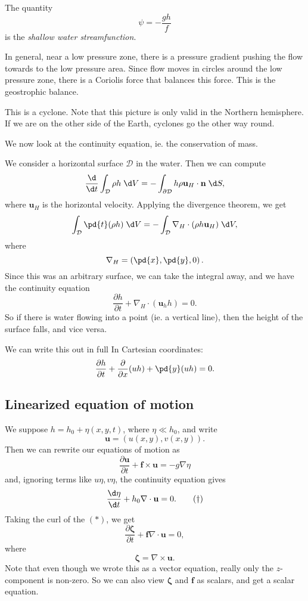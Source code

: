 \documentclass[a4paper]{article}
\begin{document}
\begin{defi}
  The quantity
  \[
    \psi = -\frac{gh}{f}
  \]
  is the \emph{shallow water streamfunction}.
\end{defi}

In general, near a low pressure zone, there is a pressure gradient pushing the flow towards to the low pressure area. Since flow moves in circles around the low pressure zone, there is a Coriolis force that balances this force. This is the geostrophic balance.
\begin{center}
\end{center}
This is a cyclone. Note that this picture is only valid in the Northern hemisphere. If we are on the other side of the Earth, cyclones go the other way round.

We now look at the continuity equation, ie. the conservation of mass.

We consider a horizontal surface $\mathcal{D}$ in the water. Then we can compute
\[
  \frac{\d}{\d t} \int_\mathcal{D} \rho h \;\d V = -\int_{\partial \mathcal{D}} h \rho \mathbf{u}_H \cdot \mathbf{n}\;\d S,
\]
where $\mathbf{u}_H$ is the horizontal velocity. Applying the divergence theorem, we get
\[
  \int_{\mathcal{D}} \pd{t} (\rho h)\;\d V = -\int_{\mathcal{D}} \nabla_H \cdot (\rho h \mathbf{u}_H)\;\d V,
\]
where
\[
  \nabla_H = \left(\pd{x}, \pd{y}, 0\right).
\]
Since this was an arbitrary surface, we can take the integral away, and we have the continuity equation
\[
  \frac{\partial h}{\partial t} + \nabla_H \cdot (\mathbf{u}_h h) = 0.
\]
So if there is water flowing into a point (ie. a vertical line), then the height of the surface falls, and vice versa.

We can write this out in full In Cartesian coordinates:
\[
  \frac{\partial h}{\partial t} + \frac{\partial}{\partial x}(uh) + \pd{y}(uh) = 0.
\]
\subsection{Linearized equation of motion}
We suppose $h = h_0 + \eta(x, y, t)$, where $\eta \ll h_0$, and write
\[
  \mathbf{u} = (u(x, y), v(x, y)).
\]
Then we can rewrite our equations of motion as
\[
  \frac{\partial \mathbf{u}}{\partial t} + \mathbf{f} \times \mathbf{u} = -g \nabla \eta\tag{$*$}
\]
and, ignoring terms like $u\eta, v\eta$, the continuity equation gives
\[
  \frac{\d \eta}{\d t} + h_0 \nabla \cdot \mathbf{u} = 0.\tag{$\dagger$}
\]
Taking the curl of the $(*)$, we get
\[
  \frac{\partial \boldsymbol\zeta}{\partial t} + \mathbf{f}\nabla \cdot \mathbf{u} = 0,
\]
where
\[
  \boldsymbol\zeta = \nabla \times \mathbf{u}.
\]
Note that even though we wrote this as a vector equation, really only the $z$-component is non-zero. So we can also view $\boldsymbol\zeta$ and $\mathbf{f}$ as scalars, and get a scalar equation.
\end{document}
